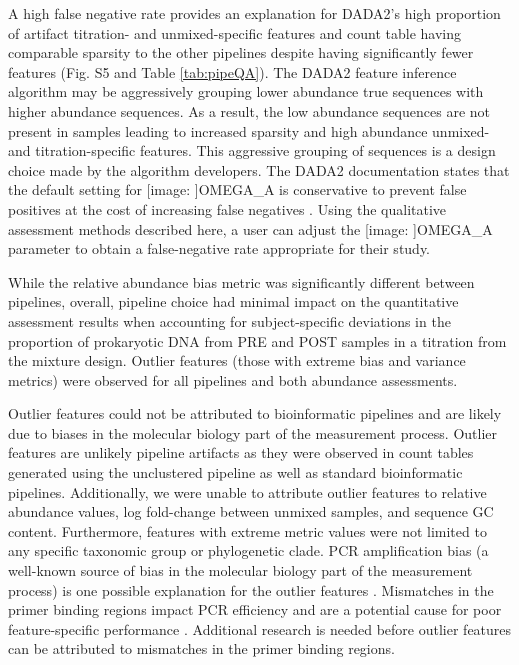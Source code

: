 \documentclass[linenumbers]{bmcart}
\def\texttt{[image: ]}
\begin{document}
A high false negative rate provides an explanation for DADA2's high proportion
of artifact titration- and unmixed-specific features and count table having
comparable sparsity to the other pipelines despite having significantly fewer
features (Fig. S5 and Table \ref{tab:pipeQA}).
The DADA2 feature inference algorithm may be aggressively grouping
lower abundance true sequences with higher abundance sequences.
As a result, the low abundance sequences are not present in samples
leading to increased sparsity and high abundance unmixed- and titration-specific features.
This aggressive grouping of sequences is a design choice made by the algorithm developers.
The DADA2 documentation states that the default setting for \texttt{OMEGA\_A}
is conservative to prevent false positives at the cost of increasing false negatives \cite{callahan2016dada2}.
Using the qualitative assessment methods described here, a user can
adjust the \texttt{OMEGA\_A} parameter to obtain a false-negative rate appropriate for their study. 


While the relative abundance bias metric was significantly different
between pipelines, overall, pipeline choice had minimal impact on the
quantitative assessment results when accounting for subject-specific deviations
in the proportion of prokaryotic DNA from PRE and POST samples in a
titration from the mixture design. Outlier features (those with extreme bias
and variance metrics) were observed for all pipelines and both abundance assessments.

Outlier features could not be attributed to bioinformatic pipelines
and are likely due to biases in the molecular biology part of the measurement process.
Outlier features are unlikely pipeline artifacts as they were observed in count tables generated
using the unclustered pipeline as well as standard bioinformatic
pipelines. Additionally, we were unable to attribute outlier features to relative
abundance values, log fold-change between unmixed samples, and sequence
GC content. Furthermore, features with extreme metric values were not limited to any
specific taxonomic group or phylogenetic clade. PCR amplification
bias (a well-known source of bias in the molecular biology part of the
measurement process) is one possible explanation for the outlier features \cite{Sze565598}.
Mismatches in the primer binding regions impact PCR efficiency
and are a potential cause for poor feature-specific
performance \cite{wright2014exploiting}. Additional research is
needed before outlier features can be attributed to mismatches in the primer binding regions.
\end{document}
